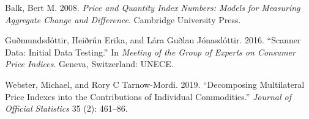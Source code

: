 \documentclass[
  letterpaper,
]{article}
\newlength{\cslhangindent}
\newenvironment{CSLReferences}[2] %
 {\begin{list}{}{%
  \setlength{\itemindent}{0pt}
  \setlength{\leftmargin}{0pt}
  \setlength{\parsep}{0pt}
  \ifodd #1
   \setlength{\leftmargin}{\cslhangindent}
   \setlength{\itemindent}{-1\cslhangindent}
  \fi
  \setlength{\itemsep}{#2\baselineskip}}}
 {\end{list}}
\begin{document}
\label{refs}
\begin{CSLReferences}{1}{0}
Balk, Bert M. 2008. \emph{Price and Quantity Index Numbers: Models for
Measuring Aggregate Change and Difference}. Cambridge University Press.

Guðmundsdóttir, Heiðrún Erika, and Lára Guðlau Jónasdóttir. 2016.
{``Scanner Data: Initial Data Testing.''} In \emph{Meeting of the Group
of Experts on Consumer Price Indices}. Geneva, Switzerland: UNECE.

Webster, Michael, and Rory C Tarnow-Mordi. 2019. {``Decomposing
Multilateral Price Indexes into the Contributions of Individual
Commodities.''} \emph{Journal of Official Statistics} 35 (2): 461--86.

\end{CSLReferences}
\end{document}
